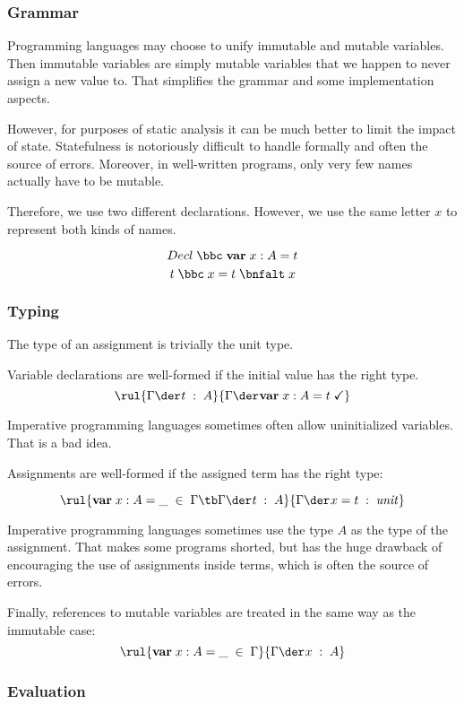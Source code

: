 \subsubsection{Grammar}

Programming languages may choose to unify immutable and mutable variables.
Then immutable variables are simply mutable variables that we happen to never assign a new value to.
That simplifies the grammar and some implementation aspects.

However, for purposes of static analysis it can be much better to limit the impact of state.
Statefulness is notoriously difficult to handle formally and often the source of errors.
Moreover, in well-written programs, only very few names actually have to be mutable.

Therefore, we use two different declarations.
However, we use the same letter $x$ to represent both kinds of names.

\[Decl \;\bbc\; \amval{x}{A}{t}\]
\[t \;\bbc\; x=t \;\bnfalt\; x\]

\subsubsection{Typing}

The type of an assignment is trivially the unit type.

Variable declarations are well-formed if the initial value has the right type.
\[\rul{\oftype{}{\Gamma}{t}{A}}
      {\isdecl{}{\Gamma}{\amval{x}{A}{t}}}
\]

Imperative programming languages sometimes often allow uninitialized variables.
That is a bad idea.

Assignments are well-formed if the assigned term has the right type:

\[\rul{\amval{x}{A}{\_} \;\in\;\Gamma \tb \oftype{}{\Gamma}{t}{A}}
      {\oftype{}{\Gamma}{x=t}{\Unit}}
\]

Imperative programming languages sometimes use the type $A$ as the type of the assignment.
That makes some programs shorted, but has the huge drawback of encouraging the use of assignments inside terms, which is often the source of errors.

Finally, references to mutable variables are treated in the same way as the immutable case:
\[\rul{\amval{x}{A}{\_} \;\in\;\Gamma}
      {\oftype{}{\Gamma}{x}{A}}
\]


\subsubsection{Evaluation}

